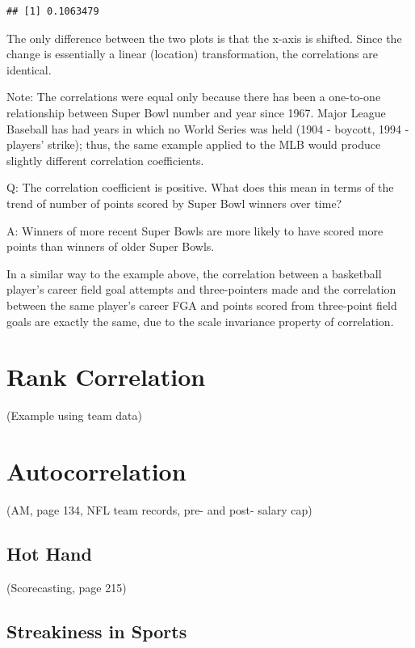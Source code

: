 \documentclass[
  11pt,
]{book}
\theoremstyle{definition}
\theoremstyle{definition}
\theoremstyle{definition}
\theoremstyle{definition}
\theoremstyle{remark}
\begin{document}
\begin{verbatim}
## [1] 0.1063479
\end{verbatim}

The only difference between the two plots is that the x-axis is shifted. Since the change is essentially a linear (location) transformation, the correlations are identical.

Note: The correlations were equal only because there has been a one-to-one relationship between Super Bowl number and year since 1967. Major League Baseball has had years in which no World Series was held (1904 - boycott, 1994 - players' strike); thus, the same example applied to the MLB would produce slightly different correlation coefficients.

Q: The correlation coefficient is positive. What does this mean in terms of the trend of number of points scored by Super Bowl winners over time?

A: Winners of more recent Super Bowls are more likely to have scored more points than winners of older Super Bowls.

In a similar way to the example above, the correlation between a basketball player's career field goal attempts and three-pointers made and the correlation between the same player's career FGA and points scored from three-point field goals are exactly the same, due to the scale invariance property of correlation.

\hypertarget{rank-correlation}{%
\section{Rank Correlation}\label{rank-correlation}}

(Example using team data)

\hypertarget{autocorrelation}{%
\section{Autocorrelation}\label{autocorrelation}}

(AM, page 134, NFL team records, pre- and post- salary cap)

\hypertarget{hot-hand}{%
\subsection{Hot Hand}\label{hot-hand}}

(Scorecasting, page 215)

\hypertarget{streakiness-in-sports}{%
\subsection{Streakiness in Sports}\label{streakiness-in-sports}}
\end{document}
